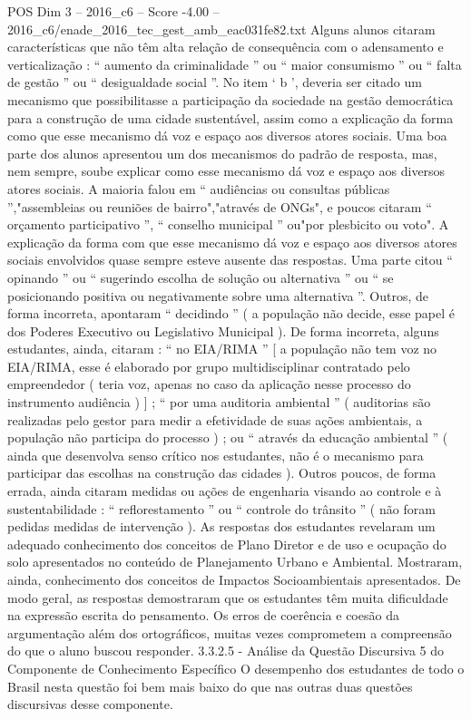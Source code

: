 \begin{textsample}{POS Dim 3 – 2016\_c6 – Score -4.00 – 2016\_c6/enade\_2016\_tec\_gest\_amb\_eac031fe82.txt}
Alguns alunos citaram características que não têm alta relação de consequência com o adensamento e verticalização : “ aumento da criminalidade ” ou “ maior consumismo ” ou “ falta de gestão ” ou “ desigualdade social ”.
No item ‘ b ’, deveria ser citado um mecanismo que possibilitasse a participação da sociedade na gestão democrática para a construção de uma cidade sustentável, assim como a explicação da forma como que esse mecanismo dá voz e espaço aos diversos atores sociais.
Uma boa parte dos alunos apresentou um dos mecanismos do padrão de resposta, mas, nem sempre, soube explicar como esse mecanismo dá voz e espaço aos diversos atores sociais.
A maioria falou em “ audiências ou consultas públicas ”,"assembleias ou reuniões de bairro","através de ONGs", e poucos citaram “ orçamento participativo ”, “ conselho municipal ” ou"por plesbicito ou voto".
A explicação da forma com que esse mecanismo dá voz e espaço aos diversos atores sociais envolvidos quase sempre esteve ausente das respostas.
Uma parte citou “ opinando ” ou “ sugerindo escolha de solução ou alternativa ” ou “ se posicionando positiva ou negativamente sobre uma alternativa ”.
Outros, de forma incorreta, apontaram “ decidindo ” ( a população não decide, esse papel é dos Poderes Executivo ou Legislativo Municipal ).
De forma incorreta, alguns estudantes, ainda, citaram : “ no EIA/RIMA ” [ a população não tem voz no EIA/RIMA, esse é elaborado por grupo multidisciplinar contratado pelo empreendedor ( teria voz, apenas no caso da aplicação nesse processo do instrumento audiência ) ] ; “ por uma auditoria ambiental ” ( auditorias são realizadas pelo gestor para medir a efetividade de suas ações ambientais, a população não participa do processo ) ; ou “ através da educação ambiental ” ( ainda que desenvolva senso crítico nos estudantes, não é o mecanismo para participar das escolhas na construção das cidades ).
Outros poucos, de forma errada, ainda citaram medidas ou ações de engenharia visando ao controle e à sustentabilidade : “ reflorestamento ” ou “ controle do trânsito ” ( não foram pedidas medidas de intervenção ).
As respostas dos estudantes revelaram um adequado conhecimento dos conceitos de Plano Diretor e de uso e ocupação do solo apresentados no conteúdo de Planejamento Urbano e Ambiental.
Mostraram, ainda, conhecimento dos conceitos de Impactos Socioambientais apresentados.
De modo geral, as respostas demostraram que os estudantes têm muita dificuldade na expressão escrita do pensamento.
Os erros de coerência e coesão da argumentação além dos ortográficos, muitas vezes comprometem a compreensão do que o aluno buscou responder. 3.3.2.5 - Análise da Questão Discursiva 5 do Componente de Conhecimento Específico O desempenho dos estudantes de todo o Brasil nesta questão foi bem mais baixo do que nas outras duas questões discursivas desse componente.

\end{textsample}
